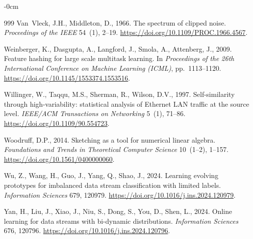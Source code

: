 \documentclass[sensors,article,submit,pdftex,moreauthors]{Definitions/mdpi}
\begin{document}
\begin{adjustwidth}{-\extralength}{0cm}
\begin{thebibliography}{999}
Van~Vleck, J.H., Middleton, D., 1966.
\newblock The spectrum of clipped noise.
\newblock \emph{Proceedings of the IEEE} 54~(1), 2--19.
\newblock \url{https://doi.org/10.1109/PROC.1966.4567}.

Weinberger, K., Dasgupta, A., Langford, J., Smola, A., Attenberg, J., 2009.
\newblock Feature hashing for large scale multitask learning.
\newblock In \emph{Proceedings of the 26th International Conference on Machine Learning (ICML)}, pp.~1113--1120.
\newblock \url{https://doi.org/10.1145/1553374.1553516}.

Willinger, W., Taqqu, M.S., Sherman, R., Wilson, D.V., 1997.
\newblock Self-similarity through high-variability: statistical analysis of Ethernet LAN traffic at the source level.
\newblock \emph{IEEE/ACM Transactions on Networking} 5~(1), 71--86.
\newblock \url{https://doi.org/10.1109/90.554723}.

Woodruff, D.P., 2014.
\newblock Sketching as a tool for numerical linear algebra.
\newblock \emph{Foundations and Trends in Theoretical Computer Science} 10~(1--2), 1--157.
\newblock \url{https://doi.org/10.1561/0400000060}.

Wu, Z., Wang, H., Guo, J., Yang, Q., Shao, J., 2024.
\newblock Learning evolving prototypes for imbalanced data stream classification with limited labels.
\newblock \emph{Information Sciences} 679, 120979.
\newblock \url{https://doi.org/10.1016/j.ins.2024.120979}.

Yan, H., Liu, J., Xiao, J., Niu, S., Dong, S., You, D., Shen, L., 2024.
\newblock Online learning for data streams with bi-dynamic distributions.
\newblock \emph{Information Sciences} 676, 120796.
\newblock \url{https://doi.org/10.1016/j.ins.2024.120796}.

\end{thebibliography}
\end{adjustwidth}
\end{document}
